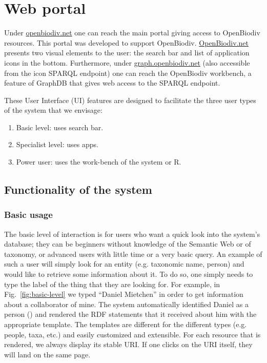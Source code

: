 
\chapter{Web portal} %
\label{chapter-webportal}


Under \href{http://openbiodiv.net}{openbiodiv.net} one can reach the main portal giving access to OpenBiodiv resources. This portal was developed to support OpenBiodiv. \href{http://openbiodiv.net}{OpenBiodiv.net} presents two visual elements to the user: the search bar and list of application icons in the bottom. Furthermore, under \href{http://graph.openbiodiv.net}{graph.openbiodiv.net} (also accessible from the icon SPARQL endpoint) one can reach the OpenBiodiv workbench, a feature of GraphDB that gives web access to the SPARQL endpoint.

These User Interface (UI) features are designed to facilitate the three user types of the system that we envisage:

\begin{enumerate}
    \item Basic level: uses search bar.
    \item Specialist level: uses apps.
    \item Power user: uses the work-bench of the system or R.
\end{enumerate}

\section{Functionality of the system}

\subsection{Basic usage}

The basic level of interaction is for users who want a quick look into the system's database; they can be beginners without knowledge of the Semantic Web or of taxonomy, or advanced users with little time or a very basic query. An example of such a user will simply look for an entity (e.g. taxonomic name, person) and would like to retrieve some information about it. To do so, one simply needs to type the label of the thing that they are looking for. For example, in Fig.~\ref{fig:basic-level} we typed ``Daniel Mietchen'' in order to get information about a collaborator of mine. The system automatically identified Daniel as a person () and rendered the RDF statements that it received about him with the appropriate template. The templates are different for the different types (e.g. people, taxa, etc.) and easily customized and extensible. For each resource that is rendered, we always display its stable URI. If one clicks on the URI itself, they will land on the same page.

